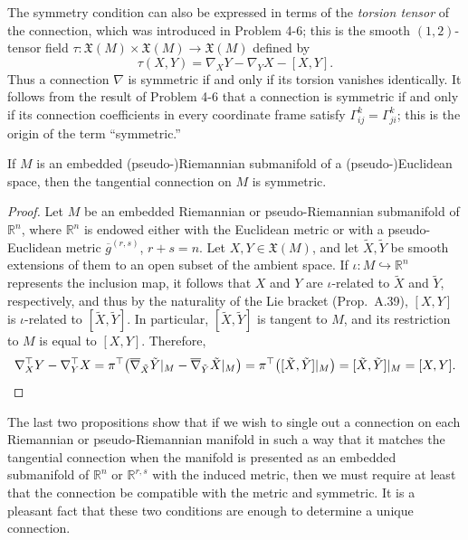 The symmetry condition can also be expressed in terms of the \emph{torsion tensor} of the connection, which was introduced in Problem 4-6; this is the smooth $(1,2)$-tensor field $\tau : \mathfrak{X}(M) \times \mathfrak{X}(M) \to \mathfrak{X}(M)$ defined by
\[
\tau(X, Y) = \nabla_X Y - \nabla_Y X - [X, Y].
\]
Thus a connection $\nabla$ is symmetric if and only if its torsion vanishes identically. It follows from the result of Problem 4-6 that a connection is symmetric if and only if its connection coefficients in every coordinate frame satisfy $\Gamma^k_{ij} = \Gamma^k_{ji}$; this is the origin of the term ``symmetric.''

\begin{proposition}
\label{prop:tangential-connection-symmetric}

If $M$ is an embedded (pseudo-)Riemannian submanifold of a (pseudo-)Euclidean space, then the tangential connection on $M$ is symmetric.

\begin{proof}
Let $M$ be an embedded Riemannian or pseudo-Riemannian submanifold of $\mathbb{R}^n$, where $\mathbb{R}^n$ is endowed either with the Euclidean metric or with a pseudo-Euclidean metric $\overline{g}^{(r,s)}$, $r + s = n$. Let $X, Y \in \mathfrak{X}(M)$, and let $\tilde{X}, \tilde{Y}$ be smooth extensions of them to an open subset of the ambient space. If $\iota : M \hookrightarrow \mathbb{R}^n$ represents the inclusion map, it follows that $X$ and $Y$ are $\iota$-related to $\tilde{X}$ and $\tilde{Y}$, respectively, and thus by the naturality of the Lie bracket (Prop.~A.39), $[X, Y]$ is $\iota$-related to $[\tilde{X}, \tilde{Y}]$. In particular, $[\tilde{X}, \tilde{Y}]$ is tangent to $M$, and its restriction to $M$ is equal to $[X, Y]$. Therefore,
\[
\nabla^{\top}_X Y - \nabla^{\top}_Y X = \pi^{\top}\bigl(\overline{\nabla}_{\tilde X} \tilde Y|_M - \overline{\nabla}_{\tilde Y} \tilde X|_M\bigr)
= \pi^{\top}\bigl([\tilde X, \tilde Y]|_M\bigr)
= [\tilde X, \tilde Y]|_M
= [X, Y]. \qedhere
\]
\end{proof}
\end{proposition}

The last two propositions show that if we wish to single out a connection on each Riemannian or pseudo-Riemannian manifold in such a way that it matches the tangential connection when the manifold is presented as an embedded submanifold of $\mathbb{R}^n$ or $\mathbb{R}^{r,s}$ with the induced metric, then we must require at least that the connection be compatible with the metric and symmetric. It is a pleasant fact that these two conditions are enough to determine a unique connection.

